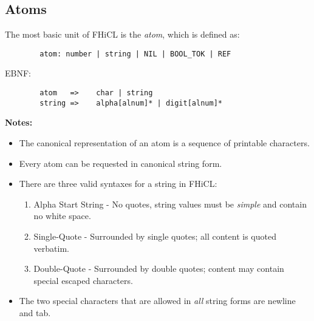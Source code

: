 \documentclass{memarticle}
\begin{document}
{                \subsection{Atoms}
                        The most basic unit of FHiCL is the \emph{atom},
                        which is defined as: 
                \begin{verbatim}
        atom: number | string | NIL | BOOL_TOK | REF
                \end{verbatim}
                        EBNF:
                \begin{verbatim}
        atom   =>    char | string
        string =>    alpha[alnum]* | digit[alnum]*
                \end{verbatim}
                        \par
                        \textbf{ Notes: }
                        \begin{itemize}
                                \item The canonical representation of an atom is a sequence of printable characters.
                                \item Every atom can be requested in canonical string form.
                                \item There are three valid syntaxes for a string in FHiCL:
                                \begin{enumerate}
                                        \item Alpha Start String - No quotes, string values must be \emph{simple}
                                                and contain no white space.
                                        \item Single-Quote - Surrounded by single quotes;
                                                all content is quoted verbatim.
                                        \item Double-Quote - Surrounded by double quotes;
                                                content may contain special escaped characters.
                                \end{enumerate}
                                \item The two special characters that are allowed in \emph{all} string forms are newline and tab.
                        \end{itemize}
                        
}
\end{document}

